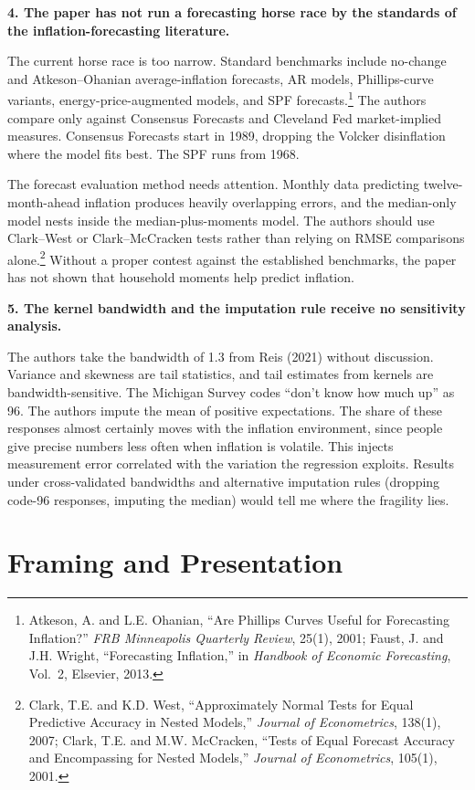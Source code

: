 \documentclass[11pt, a4paper]{article}
\begin{document}
\textbf{4. The paper has not run a forecasting horse race by the standards of the inflation-forecasting literature.}

The current horse race is too narrow. Standard benchmarks include no-change and Atkeson--Ohanian average-inflation forecasts, AR models, Phillips-curve variants, energy-price-augmented models, and SPF forecasts.\footnote{Atkeson, A. and L.E. Ohanian, ``Are Phillips Curves Useful for Forecasting Inflation?'' \textit{FRB Minneapolis Quarterly Review}, 25(1), 2001; Faust, J. and J.H. Wright, ``Forecasting Inflation,'' in \textit{Handbook of Economic Forecasting}, Vol.~2, Elsevier, 2013.} The authors compare only against Consensus Forecasts and Cleveland Fed market-implied measures. Consensus Forecasts start in 1989, dropping the Volcker disinflation where the model fits best. The SPF runs from 1968.

The forecast evaluation method needs attention. Monthly data predicting twelve-month-ahead inflation produces heavily overlapping errors, and the median-only model nests inside the median-plus-moments model. The authors should use Clark--West or Clark--McCracken tests rather than relying on RMSE comparisons alone.\footnote{Clark, T.E. and K.D. West, ``Approximately Normal Tests for Equal Predictive Accuracy in Nested Models,'' \textit{Journal of Econometrics}, 138(1), 2007; Clark, T.E. and M.W. McCracken, ``Tests of Equal Forecast Accuracy and Encompassing for Nested Models,'' \textit{Journal of Econometrics}, 105(1), 2001.} Without a proper contest against the established benchmarks, the paper has not shown that household moments help predict inflation.

\textbf{5. The kernel bandwidth and the imputation rule receive no sensitivity analysis.}

The authors take the bandwidth of 1.3 from Reis (2021) without discussion. Variance and skewness are tail statistics, and tail estimates from kernels are bandwidth-sensitive. The Michigan Survey codes ``don't know how much up'' as 96. The authors impute the mean of positive expectations. The share of these responses almost certainly moves with the inflation environment, since people give precise numbers less often when inflation is volatile. This injects measurement error correlated with the variation the regression exploits. Results under cross-validated bandwidths and alternative imputation rules (dropping code-96 responses, imputing the median) would tell me where the fragility lies.

\section{Framing and Presentation}
\end{document}

